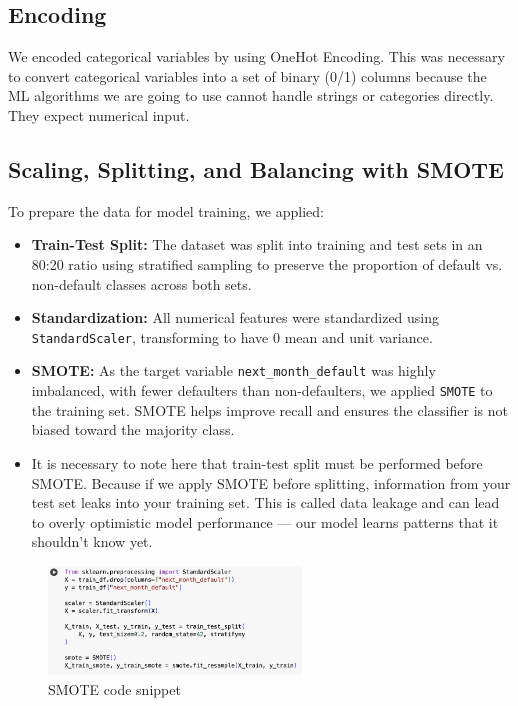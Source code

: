 \documentclass[12pt,a4paper]{article}
\begin{document}
\subsection{Encoding}
We encoded categorical variables by using OneHot Encoding. This was necessary to convert categorical variables into a set of binary (0/1) columns because the ML algorithms we are going to use cannot handle strings or categories directly. They expect numerical input.

\subsection{Scaling, Splitting, and Balancing with SMOTE}
To prepare the data for model training, we applied:
\begin{itemize}
    \item \textbf{Train-Test Split:} The dataset was split into training and test sets in an 80:20 ratio using stratified sampling to preserve the proportion of default vs. non-default classes across both sets.
    \item \textbf{Standardization:} All numerical features were standardized using \texttt{StandardScaler}, transforming to have 0 mean and unit variance.
    \item \textbf{SMOTE:} As the target variable \texttt{next\_month\_default} was highly imbalanced, with fewer defaulters than non-defaulters, we applied \texttt{SMOTE} to the training set. SMOTE helps improve recall and ensures the classifier is not biased toward the majority class.
    \item It is necessary to note here that train-test split must be performed before SMOTE. Because if we apply SMOTE before splitting, information from your test set leaks into your training set. This is called data leakage and can lead to overly optimistic model performance — our model learns patterns that it shouldn't know yet.
\end{itemize}
\begin{figure}[H]
    \centering
    \includegraphics[width=0.6\textwidth]{figures/10.png}
    \caption{SMOTE code snippet}
\end{figure}
\end{document}
